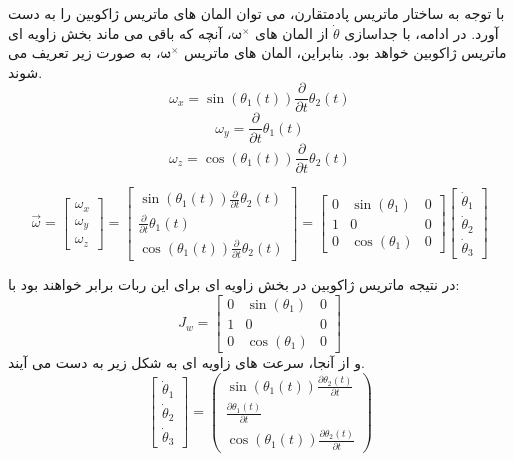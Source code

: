با توجه به ساختار ماتریس پادمتقارن، می توان المان های ماتریس ژاکوبین را به دست آورد. در ادامه، با جداسازی $\dot{\theta}$ از المان های $\boldsymbol{\omega}^\times$، آنچه که باقی می ماند بخش زاویه ای ماتریس ژاکوبین خواهد بود.
بنابراین، المان های ماتریس $\boldsymbol{\omega}^\times$، به صورت زیر تعریف می شوند.
\[
\omega_x = \sin\left(\theta_1(t)\right)\frac{\partial}{\partial t}\theta_2(t)
\]
\[
\omega_y = \frac{\partial}{\partial t}\theta_1(t)
\]
\[
\omega_z = \cos\left(\theta_1(t)\right)\frac{\partial}{\partial t}\theta_2(t)
\]

\[
\vec{\omega} = 
\begin{bmatrix}
	\omega_x \\
	\omega_y \\
	\omega_z
\end{bmatrix}
=
\begin{bmatrix}
	\sin\left(\theta_1(t)\right)\frac{\partial}{\partial t}\theta_2(t) \\
	\frac{\partial}{\partial t}\theta_1(t) \\
	\cos\left(\theta_1(t)\right)\frac{\partial}{\partial t}\theta_2(t)
\end{bmatrix}
=
\begin{bmatrix}
	0 & \sin\left(\theta_1\right) & 0 \\
	1 & 0 & 0 \\
	0 & \cos\left(\theta_1\right) & 0
\end{bmatrix}
\begin{bmatrix}
	\dot{\theta}_1 \\
	\dot{\theta}_2 \\
	\dot{\theta}_3
\end{bmatrix}
\]

در نتیجه ماتریس ژاکوبین در بخش زاویه ای برای این ربات برابر خواهند بود با:
\[
J_w = 
\begin{bmatrix}
	0 & \sin\left(\theta_1\right) & 0 \\
	1 & 0 & 0 \\
	0 & \cos\left(\theta_1\right) & 0
\end{bmatrix}
\]
و از آنجا، سرعت های زاویه ای به شکل زیر به دست می آیند.
\[
\begin{bmatrix}
	\dot{\theta}_1 \\
	\dot{\theta}_2 \\
	\dot{\theta}_3
\end{bmatrix} =
\begin{pmatrix}
	\sin\left(\theta_1(t)\right) \frac{\partial \theta_2(t)}{\partial t} \\
	\frac{\partial \theta_1(t)}{\partial t} \\
	\cos\left(\theta_1(t)\right) \frac{\partial \theta_2(t)}{\partial t}
\end{pmatrix}
\]

